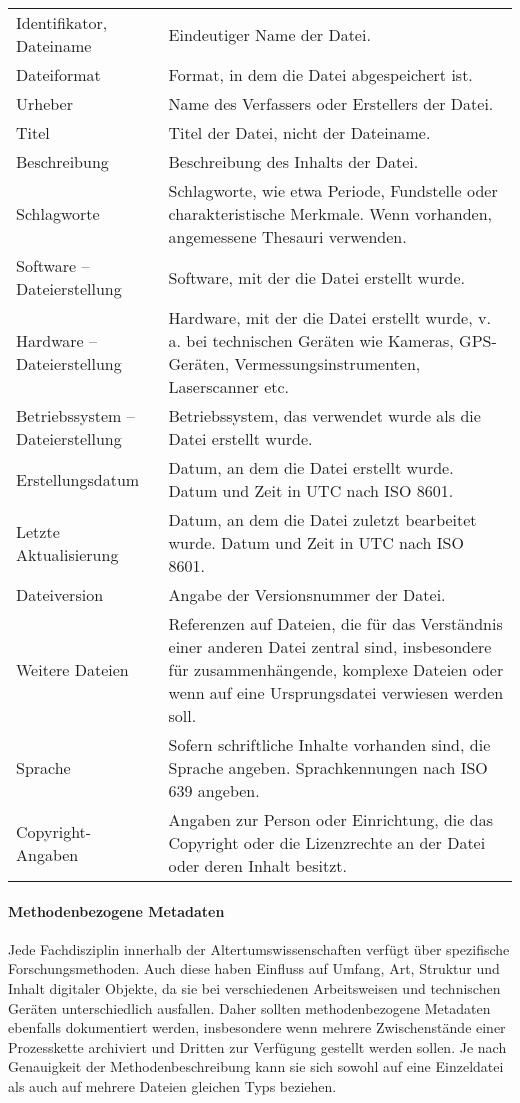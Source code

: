 \begin{center}
\begin{longtable}{L{0.25\textwidth} p{0.68\textwidth}}
		Identifikator, Dateiname & Eindeutiger Name der Datei.\\
		Dateiformat & Format, in dem die Datei abgespeichert ist.\\
		Urheber & Name des Verfassers oder Erstellers der Datei.\\
		Titel & Titel der Datei, nicht der Dateiname.\\
		Beschreibung & Beschreibung des Inhalts der Datei. \\
		Schlagworte & Schlagworte, wie etwa Periode, Fundstelle oder charakteristische Merkmale. Wenn vorhanden, angemessene Thesauri verwenden.\\
		Software -- Dateierstellung & Software, mit der die Datei erstellt wurde.\\
		Hardware -- Dateierstellung & Hardware, mit der die Datei erstellt wurde, v. a. bei technischen Geräten wie Kameras, GPS-Geräten, Vermessungsinstrumenten, Laserscanner etc.\\
		Betriebssystem -- Dateierstellung & Betriebssystem, das verwendet wurde als die Datei erstellt wurde.\\
		Erstellungsdatum & Datum, an dem die Datei erstellt wurde. Datum und Zeit in UTC nach ISO 8601.\\
		Letzte Aktualisierung & Datum, an dem die Datei zuletzt bearbeitet wurde. Datum und Zeit in UTC nach ISO 8601.\\
		Dateiversion & Angabe der Versionsnummer der Datei.\\
		Weitere Dateien & Referenzen auf Dateien, die für das Verständnis einer anderen Datei zentral sind, insbesondere für zusammenhängende, komplexe Dateien oder wenn auf eine Ursprungsdatei verwiesen werden soll.\\
		Sprache & Sofern schriftliche Inhalte vorhanden sind, die Sprache angeben. Sprachkennungen nach ISO 639 angeben.\\
		Copyright-Angaben & Angaben zur Person oder Einrichtung, die das Copyright oder die Lizenzrechte an der Datei oder deren Inhalt besitzt.\\
		\bottomrule
	\end{longtable}
\end{center}

\paragraph{Methodenbezogene Metadaten}
Jede Fachdisziplin innerhalb der Altertumswissenschaften verfügt über spezifische Forschungsmethoden. Auch diese haben Einfluss auf Umfang, Art, Struktur und Inhalt digitaler Objekte, da sie bei verschiedenen Arbeitsweisen und technischen Geräten unterschiedlich ausfallen. Daher sollten methodenbezogene Metadaten ebenfalls dokumentiert werden, insbesondere wenn mehrere Zwischenstände einer Prozesskette archiviert und Dritten zur Verfügung gestellt werden sollen. Je nach Genauigkeit der Methodenbeschreibung kann sie sich sowohl auf eine Einzeldatei als auch auf mehrere Dateien gleichen Typs beziehen.

